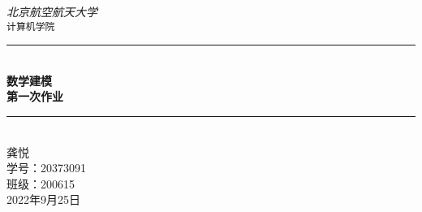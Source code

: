 \documentclass[fontset=fandol]{ctexrep}
\newcommand{\artdate}{2022年9月25日}
\begin{document}
 
 \begin{titlepage}
 
     \newcommand{\HRule}{\rule{\linewidth}{0.5mm}}
   
     \vfill
     \center 
     
     \textit{\Large 北京航空航天大学}\\[0.5cm] 
     \texttt{\Large 计算机学院}
   
     \vspace{3 cm}
     \HRule \\[0.4cm]
     { \huge \bfseries 数学建模}\\[0.4cm]
     { \huge \bfseries 第一次作业}\\
     \HRule \\[1cm]
 
     \vspace{2.5 cm}
     龚悦\\
     学号：20373091\\
     班级：200615\\
 
     \vspace{1 cm}
     {\large \artdate}\\[3cm] 
   
   \vfill
   
 \end{titlepage}

 \tableofcontents
 
 \appendix

  
 
\end{document}
